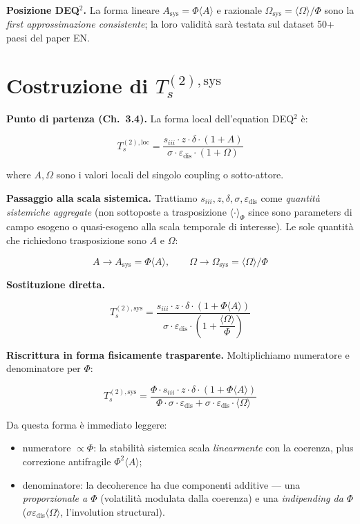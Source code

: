 \Proved{} \textbf{Posizione DEQ$^2$. } La forma lineare
\(A_{\text{sys}} = \Phi\langle A\rangle\) e razionale
\(\Omega_{\text{sys}} = \langle\Omega\rangle/\Phi\) sono la \emph{first
approssimazione consistente}; la loro validità sarà testata sul dataset
50+ paesi del paper EN.



\section{\texorpdfstring{Costruzione di
\(T_s^{(2),\text{sys}}\)}{Costruzione di T\_s\^{}\{(2),\textbackslash text\{sys\}\}}}\label{costruzione-di-t_s2textsys}

\Proved{} \textbf{Punto di partenza (Ch.~3.4).} La forma local
dell'equation DEQ$^2$ è:

\[
T_s^{(2),\text{loc}} = \frac{s_{iii} \cdot z \cdot \delta \cdot (1+A)}{\sigma \cdot \varepsilon_{\text{dis}} \cdot (1+\Omega)}
\]

where \(A, \Omega\) sono i valori locali del singolo coupling o
sotto-attore.

\Hypoth{} \textbf{Passaggio alla scala sistemica.} Trattiamo
\(s_{iii}, z, \delta, \sigma, \varepsilon_{\text{dis}}\) come
\emph{quantità sistemiche aggregate} (non sottoposte a trasposizione
\(\langle \cdot \rangle_\Phi\) since sono parameters di campo esogeno o
quasi-esogeno alla scala temporale di interesse). Le sole quantità che
richiedono trasposizione sono \(A\) e \(\Omega\):

\[
A \to A_{\text{sys}} = \Phi \langle A\rangle, \qquad \Omega \to \Omega_{\text{sys}} = \langle\Omega\rangle/\Phi
\]

\Proved{} \textbf{Sostituzione diretta.}

\[
\boxed{T_s^{(2),\text{sys}} = \frac{s_{iii} \cdot z \cdot \delta \cdot (1 + \Phi \langle A\rangle)}{\sigma \cdot \varepsilon_{\text{dis}} \cdot \left(1 + \dfrac{\langle\Omega\rangle}{\Phi}\right)}}
\]

\Proved{} \textbf{Riscrittura in forma fisicamente trasparente.}
Moltiplichiamo numeratore e denominatore per \(\Phi\):

\[
T_s^{(2),\text{sys}} = \frac{\Phi \cdot s_{iii} \cdot z \cdot \delta \cdot (1 + \Phi \langle A\rangle)}{\Phi \cdot \sigma \cdot \varepsilon_{\text{dis}} + \sigma \cdot \varepsilon_{\text{dis}} \cdot \langle\Omega\rangle}
\]

Da questa forma è immediato leggere:

\begin{itemize}
\tightlist
\item
  numeratore \(\propto \Phi\): la stabilità sistemica scala
  \emph{linearmente} con la coerenza, plus correzione antifragile
  \(\Phi^2 \langle A\rangle\);
\item
  denominatore: la decoherence ha due componenti additive --- una
  \emph{proporzionale a \(\Phi\)} (volatilità modulata dalla coerenza) e
  una \emph{indipending da \(\Phi\)}
  (\(\sigma \varepsilon_{\text{dis}} \langle\Omega\rangle\),
  l'involution structural).
\end{itemize}



